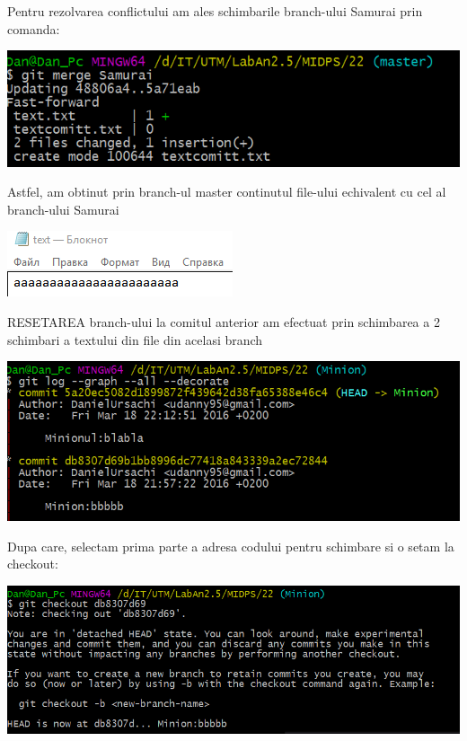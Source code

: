 Pentru rezolvarea conflictului am ales schimbarile branch-ului Samurai prin comanda:
\begin{center}
\includegraphics[width=0.7\linewidth]{15rezolv}
\end{center}
Astfel, am obtinut prin branch-ul master continutul file-ului echivalent cu cel al branch-ului Samurai
\begin{center}
\includegraphics[width=0.5\linewidth]{16demonstratie}
\end{center}
RESETAREA branch-ului la comitul anterior am efectuat prin schimbarea a 2 schimbari a textului din file din acelasi branch
\begin{center}
\includegraphics[width=0.7\linewidth]{17resetare}
\end{center}
Dupa care, selectam prima parte a adresa codului pentru schimbare si o setam la checkout:
\begin{center}
\includegraphics[width=0.7\linewidth]{18resetarechiar}
\end{center}











\clearpage